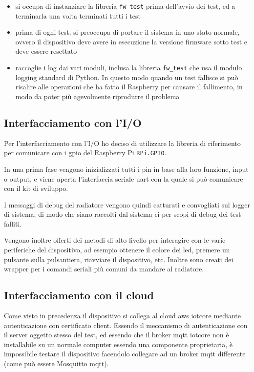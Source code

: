 \documentclass[12pt,a4paper,twoside,titlepage]{book}
\begin{document}
\begin{itemize}
    \item si occupa di instanziare la libreria \texttt{fw\_test} prima dell'avvio
        dei test, ed a terminarla una volta terminati tutti i test
    \item prima di ogni test, si preoccupa di portare il sistema in uno stato normale,
        ovvero il dispositivo deve avere in esecuzione la versione \gls{firmware} sotto test
        e deve essere resettato
    \item raccoglie i log dai vari moduli, inclusa la libreria \texttt{fw\_test} che
        usa il modulo logging standard di Python. In questo modo quando un test
        fallisce si può risalire alle operazioni che ha fatto il Raspberry per causare
        il fallimento, in modo da poter più agevolmente riprodurre il problema
\end{itemize}

\subsection{Interfacciamento con l'I/O}

Per l'interfacciamento con l'I/O ho deciso di utilizzare la libreria di riferimento
per comunicare con i \Gls{gpio} del Raspberry Pi \texttt{RPi.GPIO}.

In una prima fase vengono inizializzati tutti i pin in base alla loro funzione, input
o output, e viene aperta l'interfaccia seriale \acrshort{uart} con la quale si può comunicare con
il kit di sviluppo.

I messaggi di debug del radiatore vengono quindi catturati e convogliati sul logger
di sistema, di modo che siano raccolti dal sistema \acrfull{ci} per scopi di debug 
dei test falliti.

Vengono inoltre offerti dei metodi di alto livello per interagire con le varie
periferiche del dispositivo, ad esempio ottenere il colore dei led, premere un
pulsante sulla pulsantiera, riavviare il dispositivo, etc.
Inoltre sono creati dei wrapper per i comandi seriali più comuni da mandare al
radiatore.

\subsection{Interfacciamento con il cloud}

Come visto in precedenza il dispositivo si collega al cloud \acrshort{aws} \Gls{iotcore} mediante
autenticazione con certificato client. Essendo il meccanismo di autenticazione con il
server oggetto stesso del test, ed essendo che il \gls{broker} \acrshort{mqtt} \Gls{iotcore} non è installabile
su un normale computer essendo una componente proprietaria, è impossibile testare il
dispositivo facendolo collegare ad un \gls{broker} \Gls{mqtt} differente (come può essere Mosquitto \Gls{mqtt}).
\end{document}
